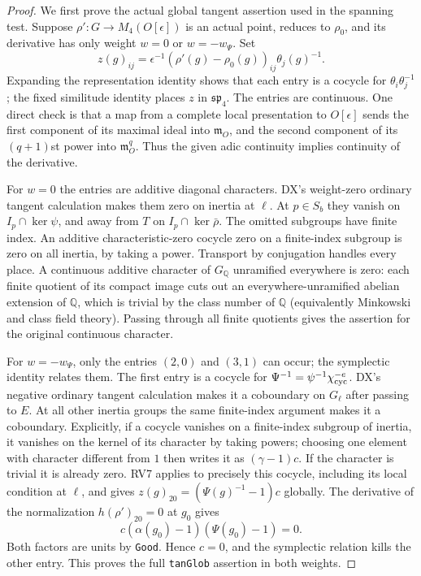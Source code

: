 \begin{proof}
We first prove the actual global tangent assertion used in
the spanning test.  Suppose $\rho':G\to M_4(O[\epsilon])$
is an actual point, reduces to $\rho_0$, and its derivative
has only weight $w=0$ or $w=-w_\Psi$.  Set
\[
 z(g)_{ij}=\epsilon^{-1}(\rho'(g)-\rho_0(g))_{ij}
                                  \theta_j(g)^{-1}.
 \tag{PX.11}
\]
Expanding the representation identity shows that each entry
is a cocycle for $\theta_i\theta_j^{-1}$; the fixed
similitude identity places $z$ in $\mathfrak{sp}_4$.
The entries are continuous.  One direct check is that a
map from a complete local presentation to $O[\epsilon]$
sends the first component of its maximal ideal into
$\mathfrak m_O$, and the second component of its
$(q+1)$st power into $\mathfrak m_O^q$.  Thus the
given adic continuity implies continuity of the derivative.

For $w=0$ the entries are additive diagonal characters.
DX's weight-zero ordinary tangent calculation makes them
zero on inertia at $\ell$.  At $p\in S_b$ they vanish on
$I_p\cap\ker\psi$, and away from $T$ on
$I_p\cap\ker\bar\rho$.  The omitted subgroups have finite
index.  An additive characteristic-zero cocycle zero on a
finite-index subgroup is zero on all inertia, by taking a
power.  Transport by conjugation handles every place.
A continuous additive character of $G_{\mathbb Q}$
unramified everywhere is zero: each finite quotient of its
compact image cuts out an everywhere-unramified abelian
extension of $\mathbb Q$, which is trivial by the class
number of $\mathbb Q$ (equivalently Minkowski and class
field theory).  Passing through all finite quotients gives
the assertion for the original continuous character.

For $w=-w_\Psi$, only the entries $(2,0)$ and $(3,1)$
can occur; the symplectic identity relates them.  The first
entry is a cocycle for $\Psi^{-1}=\psi^{-1}\chi_{\rm cyc}^{-e}$.
DX's negative ordinary tangent calculation makes it a
coboundary on $G_\ell$ after passing to $E$.  At all other
inertia groups the same finite-index argument makes it a
coboundary.  Explicitly, if a cocycle vanishes on a
finite-index subgroup of inertia, it vanishes on the
kernel of its character by taking powers; choosing one
element with character different from $1$ then writes it
as $(\gamma-1)c$.  If the character is trivial it is
already zero.  RV7 applies to precisely this cocycle,
including its local condition at $\ell$, and gives
$z(g)_{20}=(\Psi(g)^{-1}-1)c$ globally.  The derivative
of the normalization $h(\rho')_{20}=0$ at $g_0$ gives
\[
             c(\alpha(g_0)-1)(\Psi(g_0)-1)=0.
 \tag{PX.12}
\]
Both factors are units by \texttt{Good}.  Hence $c=0$,
and the symplectic relation kills the other entry.  This
proves the full \texttt{tanGlob} assertion in both weights.


\end{proof}
